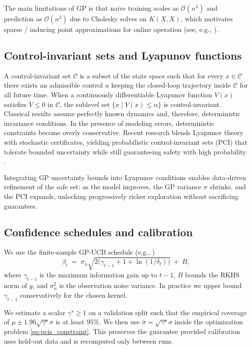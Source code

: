 \documentclass[10pt]{article}
\newcommand{\sig}{\sigma}
\newcommand{\mumu}{\mu}
\newcommand{\1}{\mathbbm{1}}
\begin{document}
The main limitations of GP is that naive training scales as \(\mathcal O(n^3)\) and prediction as \(\mathcal O(n^2)\) due to Cholesky solves on \(K(X,X)\), which motivates sparse / inducing point approximations for online operation (see, e.g., \citep{RasmussenWilliams2006GPML}).

\subsection{Control-invariant sets and Lyapunov functions}
A control-invariant set $\mathcal C$ is a subset of the state space such that for every $x\in\mathcal C$ there exists an admissible control $u$ keeping the closed-loop trajectory inside $\mathcal C$ for all future time.  When a continuously differentiable Lyapunov function $V(x)$ satisfies $\dot V\le0$ in $\mathcal C$, the sublevel set $\{x\mid V(x)\le\alpha\}$ is control-invariant.  Classical results assume perfectly known dynamics and, therefore, deterministic invariance conditions.  In the presence of modeling errors, deterministic constraints become overly conservative.  Recent research blends Lyapunov theory with stochastic certificates, yielding probabilistic control-invariant sets (PCI) that tolerate bounded uncertainty while still guaranteeing safety with high probability \cite{wang2018safe,Gao2021PCIS}.

Integrating GP uncertainty bounds into Lyapunov conditions enables data-driven refinement of the safe set: as the model improves, the GP variance $\sigma$ shrinks, and the PCI expands, unlocking progressively richer exploration without sacrificing guarantees.

\subsection{Confidence schedules and calibration}\label{subsec:beta}
We use the finite-sample GP-UCB schedule (e.g., \cite{Srinivas2010GP-UCB})
\[
\beta_t \;=\; \sigma_n \sqrt{2\big(\gamma_{t-1} + 1 + \ln(1/\delta_t)\big)}\ +\ B,
\]
where $\gamma_{t-1}$ is the maximum information gain up to $t-1$, $B$ bounds the RKHS norm of $g$, and $\sigma_n^2$ is the observation noise variance. In practice we upper bound $\gamma_{t-1}$ conservatively for the chosen kernel. 


We estimate a scalar $\gamma^\star\ge 1$ on a validation split such that the empirical coverage of $\mumu\pm 1.96\sqrt{\gamma^\star}\sig$ is at least $95\%$. We then use $\tilde\sig=\sqrt{\gamma^\star}\sig$ inside the optimization problem \eqref{eq:pcis_constraint}. This preserves the guarantee provided calibration uses held-out data and is recomputed only between runs.
\end{document}
